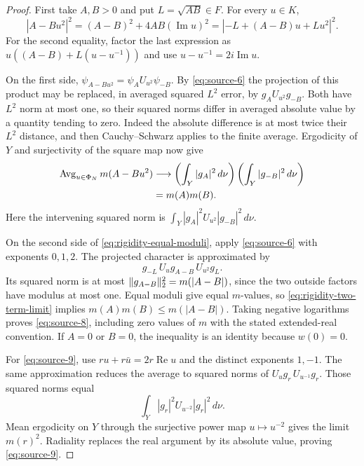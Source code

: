 \begin{proof}
First take $A,B>0$ and put $L=\sqrt{AB}\in F$.  For every $u\in K$,
\begin{equation}\label{eq:rigidity-equal-moduli}
 |A-Bu^2|^2
 =(A-B)^2+4AB(\operatorname{Im}u)^2
 =|-L+(A-B)u+Lu^2|^2.
\end{equation}
For the second equality, factor the last expression as
$u((A-B)+L(u-u^{-1}))$ and use $u-u^{-1}=2i\operatorname{Im}u$.

On the first side,
$\psi_{A-Bu^2}=\psi_AU_{u^2}\psi_{-B}$.  By
\eqref{eq:source-6} the projection of this product may be replaced,
in averaged squared $L^2$ error, by $g_AU_{u^2}g_{-B}$.  Both have
$L^2$ norm at most one, so their squared norms differ in averaged
absolute value by a quantity tending to zero.  Indeed the absolute
difference is at most twice their $L^2$ distance, and then
Cauchy--Schwarz applies to the finite average.  Ergodicity of $Y$ and
surjectivity of the square map now give
\begin{align}
 \operatorname{Avg}_{u\in\Phi_N}m(A-Bu^2)
 &\longrightarrow
 \left(\int_Y|g_A|^2\,d\nu\right)
 \left(\int_Y|g_{-B}|^2\,d\nu\right)\notag\\
 &=m(A)m(B).
 \label{eq:rigidity-two-term-limit}
\end{align}
Here the intervening squared norm is
$\int_Y|g_A|^2U_{u^2}|g_{-B}|^2\,d\nu$.

On the second side of \eqref{eq:rigidity-equal-moduli}, apply
\eqref{eq:source-6} with exponents $0,1,2$.  The projected character is
approximated by
\[
 g_{-L}\,U_ug_{A-B}\,U_{u^2}g_L.
\]
Its squared norm is at most $\lVert g_{A-B}\rVert_2^2=m(|A-B|)$, since the
two outside factors have modulus at most one.  Equal moduli give equal
$m$-values, so \eqref{eq:rigidity-two-term-limit} implies
$m(A)m(B)\leq m(|A-B|)$.  Taking negative logarithms proves
\eqref{eq:source-8}, including zero values of $m$ with the stated
extended-real convention.  If $A=0$ or $B=0$, the inequality is an
identity because $w(0)=0$.

For \eqref{eq:source-9}, use
$ru+r\bar u=2r\operatorname{Re}u$ and the distinct exponents $1,-1$.
The same approximation reduces the average to squared norms of
$U_ug_r\,U_{u^{-1}}g_r$.  Those squared norms equal
\[
 \int_Y|g_r|^2U_{u^{-2}}|g_r|^2\,d\nu.
\]
Mean ergodicity on $Y$ through the surjective power map $u\mapsto u^{-2}$
gives the limit $m(r)^2$.  Radiality replaces the real argument by its
absolute value, proving \eqref{eq:source-9}.
\end{proof}


